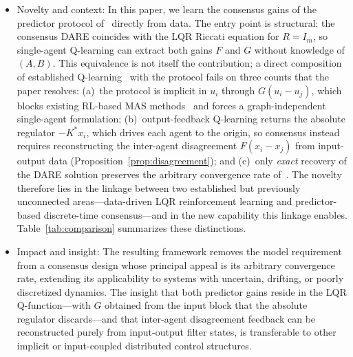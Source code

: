 \documentclass[12pt]{elsarticle}
\theoremstyle{remark}
\begin{document}
\begin{itemize}
\item Novelty and context: In this paper, we learn the consensus gains of the predictor protocol of~\cite{cacace2024} directly from data. The entry point is structural: the consensus DARE coincides with the LQR Riccati equation for $R = I_m$, so single-agent Q-learning can extract both gains $F$ and $G$ without knowledge of $(A,B)$. This equivalence is not itself the contribution; a direct composition of established Q-learning~\cite{bradtke1994,lewis2009,rizvi2022} with the protocol fails on three counts that the paper resolves: (a)~the protocol is implicit in $u_i$ through $G(u_i-u_j)$, which blocks existing RL-based MAS methods~\cite{zhang2011} and forces a graph-independent single-agent formulation; (b)~output-feedback Q-learning returns the absolute regulator $-K^*x_i$, which drives each agent to the origin, so consensus instead requires reconstructing the inter-agent disagreement $F(x_i-x_j)$ from input-output data (Proposition~\ref{prop:disagreement}); and (c)~only \emph{exact} recovery of the DARE solution preserves the arbitrary convergence rate of~\cite{cacace2024}. The novelty therefore lies in the linkage between two established but previously unconnected areas---data-driven LQR reinforcement learning and predictor-based discrete-time consensus---and in the new capability this linkage enables. Table~\ref{tab:comparison} summarizes these distinctions.
\item Impact and insight: The resulting framework removes the model requirement from a consensus design whose principal appeal is its arbitrary convergence rate, extending its applicability to systems with uncertain, drifting, or poorly discretized dynamics. The insight that both predictor gains reside in the LQR Q-function---with $G$ obtained from the input block that the absolute regulator discards---and that inter-agent disagreement feedback can be reconstructed purely from input-output filter states, is transferable to other implicit or input-coupled distributed control structures.
\end{itemize}
\end{document}
